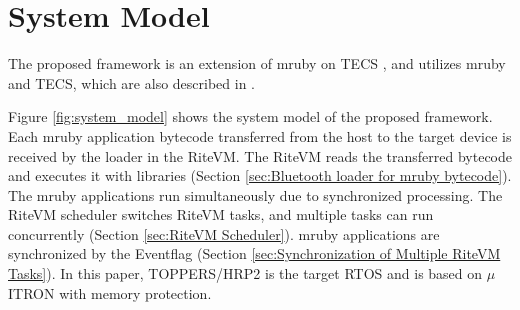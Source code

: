 \documentclass[conference]{IEEEtran/IEEEtran/IEEEtran}
\begin{document}
%
%
%
%
%

\section{System Model}
\label{sec:System Model}
The proposed framework is an extension of mruby on TECS \cite{par:mrubyonTECS}, and utilizes mruby and TECS, which are also described in \cite{par:mrubyonTECS}.

Figure \ref{fig:system_model} shows the system model of the proposed framework.
Each mruby application bytecode transferred from the host to the target device is received by the loader in the RiteVM.
The RiteVM reads the transferred bytecode and executes it with libraries (Section \ref{sec:Bluetooth loader for mruby bytecode}).
The mruby applications run simultaneously due to synchronized processing.
The RiteVM scheduler switches RiteVM tasks, and multiple tasks can run concurrently (Section \ref{sec:RiteVM Scheduler}).
mruby applications are synchronized by the Eventflag (Section \ref{sec:Synchronization of Multiple RiteVM Tasks}).
In this paper, TOPPERS/HRP2 \cite{par:hr-tecs} is the target RTOS and is based on $\mu$ITRON \cite{par:microITRON} with memory protection.
\end{document}
